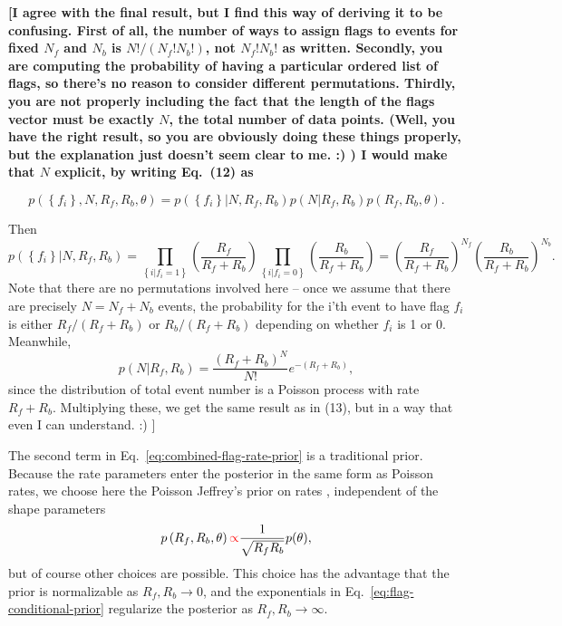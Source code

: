 \documentclass[aps,prd]{revtex4-1}
\newcommand{\mathset}[1]{\left\{ #1 \right\}}
\newcommand{\ilya}[1]{{\color{red} \bf #1}}
\begin{document}
\ilya{[I agree with the final result, but I find this way of deriving it to be confusing.  First of all, the number of ways to assign flags to events for fixed $N_f$ and $N_b$ is $N!/(N_f! N_b!)$, not $N_f! N_b!$ as written.  Secondly, you are computing the probability of having a particular ordered list of flags, so there's no reason to consider different permutations.  Thirdly, you are not properly including the fact that the length of the flags vector must be exactly $N$, the total number of data points.  (Well, you have the right result, so you are obviously doing these things properly, but the explanation just doesn't seem clear to me. :) )  I would make that $N$ explicit, by writing Eq.~(12) as 

$$
  p\left(\mathset{f_i}, N, R_f, R_b, \theta\right)  = 
  p\left( \mathset{f_i} | N, R_f, R_b\right) p\left(N |R_f, R_b\right)  
 p\left(R_f, R_b, \theta\right).
$$

Then 
$$ p\left( \mathset{f_i} | N, R_f, R_b\right) = 
\prod_{\mathset{i|f_i=1}} \left(\frac{R_f}{R_f+R_b}\right) 
\prod_{\mathset{i|f_i=0}} \left(\frac{R_b}{R_f+R_b}\right) =
\left(\frac{R_f}{R_f+R_b}\right)^{N_f} \left(\frac{R_b}{R_f+R_b}\right)^{N_b}. 
$$
Note that there are no permutations involved here -- once we assume that there are precisely $N=N_f+N_b$ events, the probability for the i'th event to have flag $f_i$ is either $R_f/(R_f+R_b)$ or $R_b/(R_f+R_b)$ depending on whether $f_i$ is 1 or 0.
Meanwhile,
$$
p\left(N |R_f, R_b\right) = \frac{\left(R_f+R_b\right)^N}{N!} e^{-(R_f+R_b)},
$$
since the distribution of total event number is a Poisson process with rate $R_f+R_b$.
Multiplying these, we get the same result as in (13), but in a way that even I can understand. :)
]}

The second term in Eq.~\eqref{eq:combined-flag-rate-prior} is a
traditional prior.  Because the rate parameters enter the posterior in
the same form as Poisson rates, we choose here the Poisson Jeffrey's
prior on rates \citep{Jeffreys1946}, independent of the shape
parameters
\begin{equation}
  p\left( R_f, R_b, \theta\right) \ilya{\propto} \frac{1}{\sqrt{R_f R_b}} p(\theta),
\end{equation}
but of course other choices are possible.  This choice has the
advantage that the prior is normalizable as $R_f, R_b \to 0$, and the
exponentials in Eq.~\eqref{eq:flag-conditional-prior} regularize the
posterior as $R_f, R_b \to \infty$.
\end{document}
